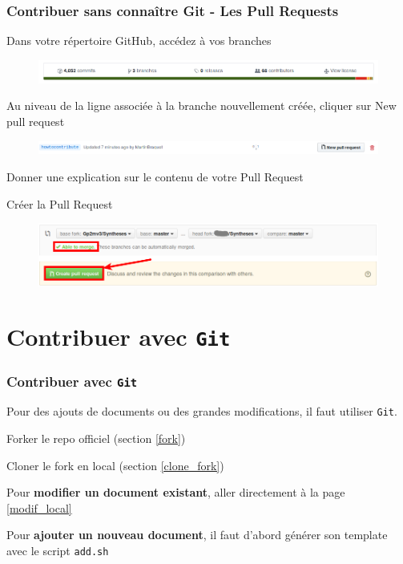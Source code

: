 \documentclass{beamer}
\newenvironment{wideitemize}{\itemize\addtolength{\itemsep}{10pt}}{\enditemize}
\begin{document}
\begin{frame}
\label{PR}
    \frametitle{Contribuer sans connaître Git - Les Pull Requests}
    \begin{wideitemize}
        \item Dans votre répertoire GitHub, accédez à vos branches
            \begin{figure}[H]
                \centering
                \includegraphics[width=\linewidth]{modif_online_branches.png}
            \end{figure}
        \item Au niveau de la ligne associée à la branche nouvellement créée, cliquer sur New pull request
            \begin{figure}[H]
                \centering
                \includegraphics[width=\linewidth]{modif_online_PR.png}
            \end{figure}
         \item Donner une explication sur le contenu de votre Pull Request
         \item Créer la Pull Request
            \begin{figure}[H]
                \centering
                \includegraphics[width=\linewidth]{create_pull_request.png}
            \end{figure}
     \end{wideitemize}
\end{frame}

\section{Contribuer avec \texttt{Git}}

\begin{frame}
    \frametitle{Contribuer avec \texttt{Git}}
    Pour des ajouts de documents ou des grandes modifications, il faut utiliser \texttt{Git}.
    \begin{wideitemize}
         \item Forker le repo officiel (section \ref{fork})
         \item Cloner le fork en local (section \ref{clone_fork})
         \item Pour \textbf{modifier un document existant}, aller directement à la page \ref{modif_local}
         \item Pour \textbf{ajouter un nouveau document}, il faut d'abord générer son template avec le script \texttt{add.sh}
     \end{wideitemize}
\end{frame}
\end{document}
